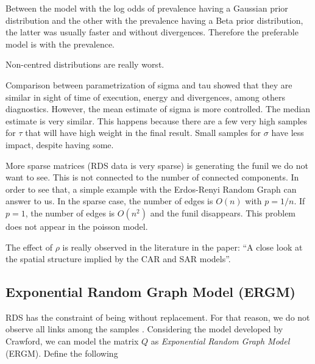 \begin{alineas}
  \item Between the model with the log odds of prevalence having a Gaussian prior
  distribution and the other with the prevalence having a Beta prior
  distribution, 
  the latter was usually faster and without divergences. Therefore the 
  preferable model is with the prevalence. 

  \item Non-centred distributions are really worst. 
  \item Comparison between parametrization of sigma and tau showed that
  they are similar in sight of time of execution, energy and divergences,
  among others diagnostics. However, the mean estimate of sigma is more
  controlled. The median estimate is very similar. This happens because there
  are a few very high samples for $\tau$ that will have high weight in the
  final result. Small samples for $\sigma$ have less impact, despite having
  some. 
  \item More sparse matrices (RDS data is very sparse) is generating the funil
  we do not want to see. This is not connected to the number of connected
  components. In order to see that, a simple example with the Erdos-Renyi
  Random Graph can answer to us. In the sparse case, the number of edges is
  $O(n)$ with $p=1/n$. If $p=1$, the number of edges is $O(n^2)$ and the funil
  disappears. This problem does not appear in the poisson model. 

  \item The effect of $\rho$ is really observed in the literature in the
  paper: ``A close look at the spatial structure implied by the CAR and SAR
  models''. 
\end{alineas}

\subsection{Exponential Random Graph Model (ERGM)}

RDS has the constraint of being without replacement. For that reason, we do
not observe all links among the samples \cite[]{crawford2016}. Considering the
model developed by Crawford, we can model the
matrix $Q$ as {\em Exponential Random Graph Model} (ERGM). Define the
following 

